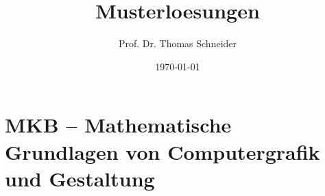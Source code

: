 \documentclass[a4paper,
               fontsize=11pt
               headsepline,
               headsepline,%
               footsepline,%
               footinclude=false,
               DIV=11,
               parskip=half,
               BCOR=8mm,
               german,
               numbers=noenddot,
               bibliography=totoc]{scrbook}
\title{Musterloesungen }
\author{Prof. Dr. Thomas Schneider }
\date{\today}
\begin{document}

\frontmatter
\tableofcontents
\mainmatter
{}
\part{MKB -- Mathematische Grundlagen von Computergrafik und Gestaltung}

\backmatter
\nocite{*}
\end{document}
